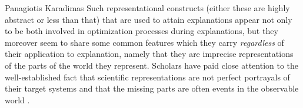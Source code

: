 \begin{artengenv}{Panagiotis Karadimas}
Such representational constructs (either these are highly abstract or less than that) that are used to attain explanations appear not only to be both involved in optimization processes during explanations, but they moreover seem to share some common features which they carry \textit{regardless} of their application to explanation, namely that they are imprecise representations of the parts of the world they represent. Scholars have paid close attention to the well-established fact that scientific representations are not perfect portrayals of their target systems
\parencite[][]{frigg_models_2017} %
 and that the missing parts are often events in the observable world 
\parencites[][]{batterman_specialness_2007}[][]{potochnik_idealization_2017}. %

\end{artengenv}
